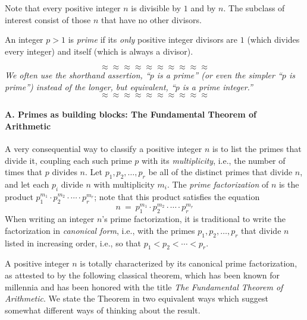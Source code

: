 Note that every positive integer $n$ is divisible by $1$ and by $n$.
The subclass of interest consist of those $n$ that have no other
divisors.

An integer $p >1$ is {\it prime}
if its {\em only} positive integer divisors are $1$ (which divides
every integer) and itself (which is always a divisor).

\[ \approx \approx \approx \approx \approx \approx \approx \approx \approx \approx \]
{\em We often use the shorthand assertion, ``$p$ is a prime'' (or even
  the simpler ``$p$ is prime'') instead of the longer, but equivalent,
  ``$p$ is a prime integer.''}
\[ \approx \approx \approx \approx \approx \approx \approx \approx \approx \approx \]

  
\paragraph{\small\sf A. Primes as building blocks: The Fundamental Theorem of Arithmetic}

A very consequential way to classify a positive integer $n$ is to list
the primes that divide it, coupling each such prime $p$ with its {\it
  multiplicity}, i.e., the number of times that $p$ divides $n$.  Let
$p_1, p_2, \ldots, p_r$ be all of the distinct primes that divide $n$,
and let each $p_i$ divide $n$ with multiplicity $m_i$.  The {\it prime
  factorization}   
of $n$ is the product $p_1^{m_1} \cdot p_2^{m_2} \cdot \cdots \cdot
p_r^{m_r}$; note that this product satisfies the equation
\begin{equation}
\label{eq:prime-factorization}
n \ = \ p_1^{m_1} \cdot p_2^{m_2} \cdot \cdots \cdot p_r^{m_r}
\end{equation}
When writing an integer $n$'s prime factorization, it is traditional
to write the factorization in {\it canonical form},
i.e., with the primes $p_1, p_2, \ldots, p_r$ that divide $n$ listed
in increasing order, i.e., so that $p_1 < p_2 < \cdots < p_r$.

A positive integer $n$ is totally characterized by its canonical prime
factorization, as attested to by the following classical theorem,
which has been known for millennia and has been honored with the title
{\em The Fundamental Theorem of Arithmetic}.
We state the Theorem in two equivalent ways which suggest somewhat
different ways of thinking about the result.

